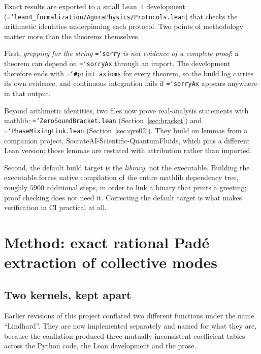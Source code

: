 \documentclass[11pt,a4paper]{article}
\newcommand{\code}[1]{\texttt{\hyphenchar\font=`\-\relax #1}}
\begin{document}
Exact results are exported to a small Lean~4 development
(\code{lean4\_formalization/AgoraPhysics/Protocols.lean}) that checks the
arithmetic identities underpinning each protocol. Two points of methodology
matter more than the theorems themselves.

First, \emph{grepping for the string} \code{sorry} \emph{is not evidence of a
complete proof}: a theorem can depend on \code{sorryAx} through an import. The
development therefore ends with \code{\#print axioms} for every theorem, so the
build log carries its own evidence, and continuous integration fails if
\code{sorryAx} appears anywhere in that output.

Beyond arithmetic identities, two files now prove real-analysis statements with
mathlib: \code{ZeroSoundBracket.lean} (Section~\ref{sec:bracket}) and
\code{PhaseMixingLink.lean} (Section~\ref{sec:qve02}). They build on lemmas
from a companion project, SocrateAI-Scientific-QuantumFluids, which pins a
different Lean version; those lemmas are restated with attribution rather than
imported.

Second, the default build target is the \emph{library}, not the executable.
Building the executable forces native compilation of the entire mathlib
dependency tree, roughly $5900$ additional steps, in order to link a binary
that prints a greeting; proof checking does not need it. Correcting the default
target is what makes verification in CI practical at all.

\section{Method: exact rational Pad\'e extraction of collective modes}
\label{sec:method}

\subsection{Two kernels, kept apart}
\label{sec:kernels}

Earlier revisions of this project conflated two different functions under the
name ``Lindhard''. They are now implemented separately and named for what they
are, because the conflation produced three mutually inconsistent coefficient
tables across the Python code, the Lean development and the prose.
\end{document}
